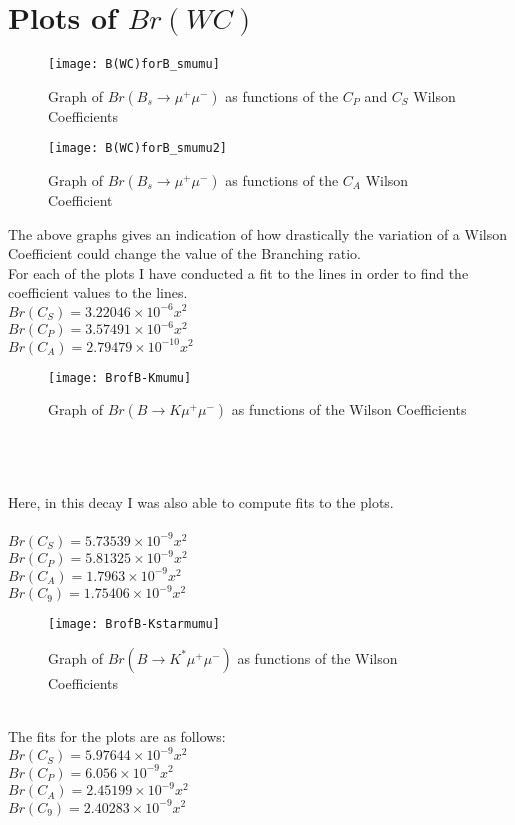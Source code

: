 \documentclass[12pt]{article}
\begin{document}
\section{Plots of $Br(WC)$}
\begin{figure}[h]
\centering
\texttt{[image: B(WC)forB\_smumu]}
\caption{Graph of $Br(B_s\rightarrow \mu^+\mu^-)$ as functions of the $C_P$ and $C_S$ Wilson Coefficients}
\end{figure}
\begin{figure}[h]
\centering
\texttt{[image: B(WC)forB\_smumu2]}
\caption{Graph of $Br(B_s\rightarrow \mu^+\mu^-)$ as functions of the $C_A$ Wilson Coefficient}
\end{figure}
The above graphs gives an indication of how drastically the variation of a Wilson Coefficient could change the value of the Branching ratio.\\
For each of the plots I have conducted a fit to the lines in order to find the coefficient values to the lines. \\
$Br(C_S)=3.22046\times10^{-6} x^2$\\
$Br(C_P)=3.57491\times10^{-6} x^2$\\
$Br(C_A)=2.79479\times10^{-10} x^2$\\
\begin{figure}[h]
\centering
\texttt{[image: BrofB-Kmumu]}
\caption{Graph of $Br(B\rightarrow K\mu^+\mu^-)$ as functions of the Wilson Coefficients}
\end{figure}\\
\\
\\
Here, in this decay I was also able to compute fits to the plots.\\
\\
$Br(C_S)=5.73539\times10^{-9} x^2$\\
$Br(C_P)=5.81325\times10^{-9} x^2$\\
$Br(C_A)=1.7963\times10^{-9} x^2$\\
$Br(C_9)=1.75406\times10^{-9} x^2$\\
\begin{figure}[h]
\centering
\texttt{[image: BrofB-Kstarmumu]}
\caption{Graph of $Br(B\rightarrow K^*\mu^+\mu^-)$ as functions of the Wilson Coefficients}
\end{figure}\\
The fits for the plots are as follows:\\
$Br(C_S)=5.97644\times10^{-9}x^2$\\
$Br(C_P)=6.056\times10^{-9}x^2$\\
$Br(C_A)=2.45199\times10^{-9} x^2$\\
$Br(C_9)=2.40283\times10^{-9} x^2$\\
\end{document}
